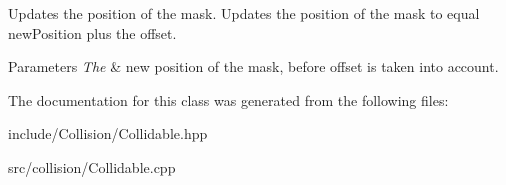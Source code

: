 Updates the position of the mask. Updates the position of the mask to equal new\+Position plus the offset. 


\begin{DoxyParams}{Parameters}
{\em The} & new position of the mask, before offset is taken into account. \\
\hline
\end{DoxyParams}


The documentation for this class was generated from the following files\+:\begin{DoxyCompactItemize}
\item 
include/\+Collision/Collidable.\+hpp\item 
src/collision/Collidable.\+cpp\end{DoxyCompactItemize}
